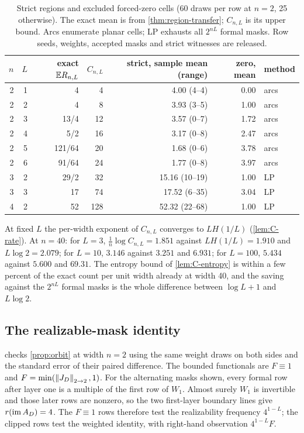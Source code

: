 \begin{table}[h]\centering\small
\begin{tabular}{rrrrrrl}
\toprule
$n$ & $L$ & exact $\mathbb{E} R_{n,L}$ & $C_{n,L}$ & strict, sample mean (range) & zero, mean & method\\
\midrule
2 & 1 & 4 & 4 & 4.00 (4--4) & 0.00 & arcs\\
2 & 2 & 4 & 8 & 3.93 (3--5) & 1.00 & arcs\\
2 & 3 & 13/4 & 12 & 3.57 (0--7) & 1.72 & arcs\\
2 & 4 & 5/2 & 16 & 3.17 (0--8) & 2.47 & arcs\\
2 & 5 & 121/64 & 20 & 1.68 (0--6) & 3.78 & arcs\\
2 & 6 & 91/64 & 24 & 1.77 (0--8) & 3.97 & arcs\\
3 & 2 & 29/2 & 32 & 15.16 (10--19) & 1.00 & LP\\
3 & 3 & 17 & 74 & 17.52 (6--35) & 3.04 & LP\\
4 & 2 & 52 & 128 & 52.32 (22--68) & 1.00 & LP\\
\bottomrule
\end{tabular}
\caption{Strict regions and excluded forced-zero cells (60 draws per row at $n=2$, 25 otherwise). The exact mean is from \cref{thm:region-transfer}; $C_{n,L}$ is its upper bound. Arcs enumerate planar cells; LP exhausts all $2^{nL}$ formal masks. Row seeds, weights, accepted masks and strict witnesses are released.}
\label{tab:regions}
\end{table}

At fixed $L$ the per-width exponent of $C_{n,L}$ converges to $LH(1/L)$ (\cref{lem:C-rate}). At $n=40$: for $L=3$, $\frac1n\log C_{n,L}=1.851$ against $LH(1/L)=1.910$ and $L\log2=2.079$; for $L=10$, $3.146$ against $3.251$ and $6.931$; for $L=100$, $5.434$ against $5.600$ and $69.31$. The entropy bound of \cref{lem:C-entropy} is within a few percent of the exact count per unit width already at width 40, and the saving against the $2^{nL}$ formal masks is the whole difference between $\log L+1$ and $L\log2$.

\subsection{The realizable-mask identity}

 checks \cref{prop:orbit} at width $n=2$ using the same weight draws on both sides and the standard error of their paired difference. The bounded functionals are $F\equiv1$ and $F=\min(\left\lVert J_D\right\rVert_{2\to 2},1)$. For the alternating masks shown, every formal row after layer one is a multiple of the first row of $W_1$. Almost surely $W_1$ is invertible and those later rows are nonzero, so the two first-layer boundary lines give $r(\operatorname{im} A_D)=4$. The $F\equiv1$ rows therefore test the realizability frequency $4^{1-L}$; the clipped rows test the weighted identity, with right-hand observation $4^{1-L}F$.

